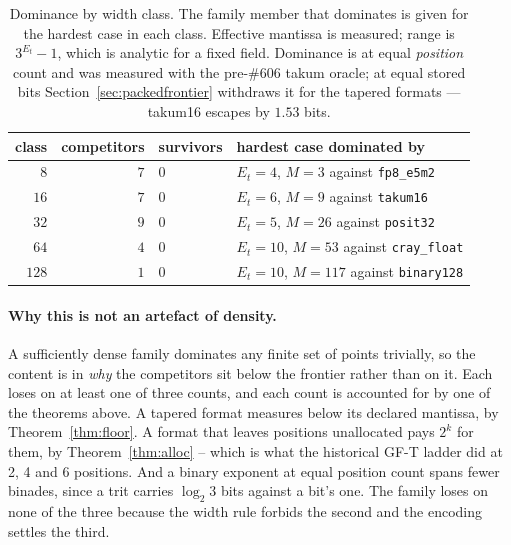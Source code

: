 \documentclass[11pt]{article}
\theoremstyle{definition}
\begin{document}
\begin{table}[t]\centering
\caption{Dominance by width class. The family member that dominates is given for
the hardest case in each class. Effective mantissa is measured; range is
$3^{E_t}-1$, which is analytic for a fixed field. Dominance is at equal
\emph{position} count and was measured with the pre-\#606 takum oracle; at
equal stored bits Section~\ref{sec:packedfrontier} withdraws it for the
tapered formats --- takum16 escapes by $1.53$ bits.}
\label{tab:nosurvivors}
\begin{tabular}{rrll}
\toprule
class & competitors & survivors & hardest case dominated by \\
\midrule
$8$   & $7$ & $0$ & $E_t{=}4$, $M{=}3$ against \texttt{fp8\_e5m2} \\
$16$  & $7$ & $0$ & $E_t{=}6$, $M{=}9$ against \texttt{takum16} \\
$32$  & $9$ & $0$ & $E_t{=}5$, $M{=}26$ against \texttt{posit32} \\
$64$  & $4$ & $0$ & $E_t{=}10$, $M{=}53$ against \texttt{cray\_float} \\
$128$ & $1$ & $0$ & $E_t{=}10$, $M{=}117$ against \texttt{binary128} \\
\bottomrule
\end{tabular}
\end{table}

\paragraph{Why this is not an artefact of density.} A sufficiently dense family
dominates any finite set of points trivially, so the content is in \emph{why} the
competitors sit below the frontier rather than on it. Each loses on at least one
of three counts, and each count is accounted for by one of the theorems above. A tapered format
measures below its declared mantissa, by Theorem~\ref{thm:floor}. A format that
leaves positions unallocated pays $2^k$ for them, by Theorem~\ref{thm:alloc} --
which is what the historical GF-T ladder did at 2, 4 and 6 positions. And a binary
exponent at equal position count spans fewer binades, since a trit carries
$\log_2 3$ bits against a bit's one. The family loses on none of the three because
the width rule forbids the second and the encoding settles the third.
\end{document}
